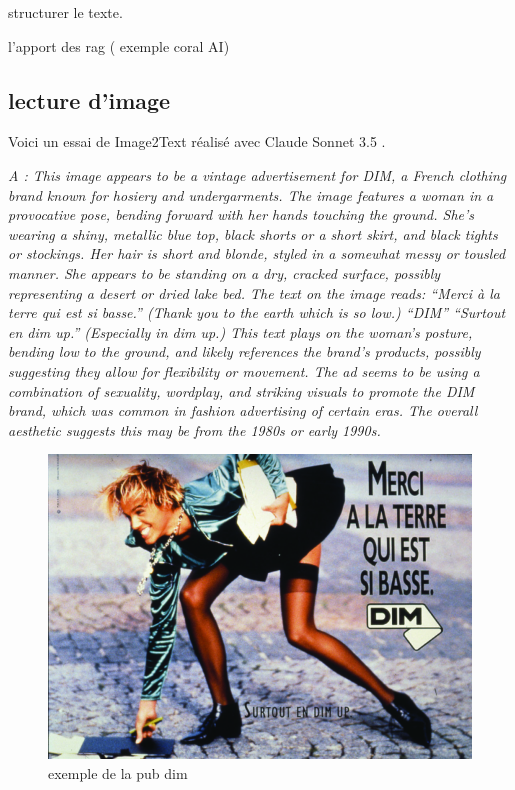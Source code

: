 \documentclass[
  letterpaper,
  DIV=11,
  numbers=noendperiod]{scrreprt}
\begin{document}
structurer le texte.

l'apport des rag ( exemple coral AI)

\subsection{lecture d'image}\label{lecture-dimage}

Voici un essai de Image2Text réalisé avec Claude Sonnet 3.5 .

\emph{A : This image appears to be a vintage advertisement for DIM, a
French clothing brand known for hosiery and undergarments. The image
features a woman in a provocative pose, bending forward with her hands
touching the ground. She's wearing a shiny, metallic blue top, black
shorts or a short skirt, and black tights or stockings. Her hair is
short and blonde, styled in a somewhat messy or tousled manner. She
appears to be standing on a dry, cracked surface, possibly representing
a desert or dried lake bed. The text on the image reads: ``Merci à la
terre qui est si basse.'' (Thank you to the earth which is so low.)
``DIM'' ``Surtout en dim up.'' (Especially in dim up.) This text plays
on the woman's posture, bending low to the ground, and likely references
the brand's products, possibly suggesting they allow for flexibility or
movement. The ad seems to be using a combination of sexuality, wordplay,
and striking visuals to promote the DIM brand, which was common in
fashion advertising of certain eras. The overall aesthetic suggests this
may be from the 1980s or early 1990s.}

\begin{figure}[H]

{\centering \includegraphics{image/pub_image_dim-4003100.jpeg}

}

\caption{exemple de la pub dim}

\end{figure}%
\end{document}
